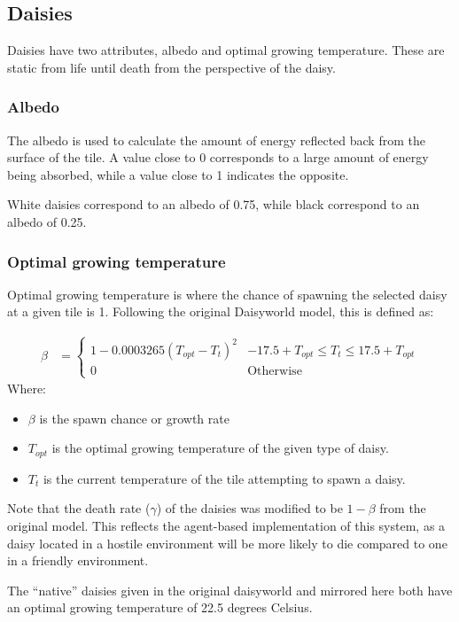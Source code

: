 \documentclass[12pt]{article}
\begin{document}
\subsection{Daisies}
Daisies have two attributes, albedo and optimal growing
temperature. These are static from life until death from the
perspective of the daisy.


\subsubsection{Albedo}
The albedo is used to calculate the amount of energy reflected back
from the surface of the tile. A value close to 0 corresponds to a large
amount of energy being absorbed, while a value close to 1 indicates
the opposite.

White daisies correspond to an albedo of 0.75, while
black correspond to an albedo of 0.25.


\subsubsection{Optimal growing temperature}
Optimal growing temperature is where the chance of spawning the
selected daisy at a given tile is 1. Following the original Daisyworld
model, this is defined as:

\begin{align}
  \beta &=
  \begin{cases}
    1 - 0.0003265(T_{opt} - T_t)^2 & -17.5+T_{opt}\leq T_t \leq 17.5+T_{opt}\\
    0 & \mathrm{Otherwise}
  \end{cases}
\end{align}
Where:
\begin{itemize}
\item $\beta$ is the spawn chance or growth rate
\item $T_{opt}$ is the optimal growing temperature of the given type
  of daisy.
\item $T_t$ is the current temperature of the tile attempting to spawn
  a daisy.
\end{itemize}

Note that the death rate ($\gamma$) of the daisies was modified to be
$1-\beta$ from the original model. This reflects the agent-based
implementation of this system, as a daisy located in a hostile
environment will be more likely to die compared to one in a friendly
environment.

The ``native'' daisies given in the original daisyworld and mirrored
here both have an optimal growing temperature of 22.5 degrees Celsius.
\end{document}
